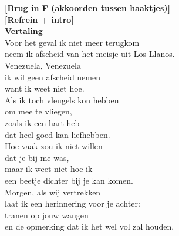 \textbf{[Brug in F (akkoorden tussen haaktjes)]}\\
\textbf{[Refrein + intro]}\\
\vspace{10em}
\textbf{Vertaling}\\
Voor het geval ik niet meer terugkom\\
neem ik afscheid van het meisje uit Los Llanos.\\
Venezuela, Venezuela\\
ik wil geen afscheid nemen\\
want ik weet niet hoe.\\\vspace{1em}
Als ik toch vleugels kon hebben\\
om mee te vliegen,\\
zoals ik een hart heb\\
dat heel goed kan liefhebben.\\\vspace{1em}
Hoe vaak zou ik niet willen\\
dat je bij me was,\\
maar ik weet niet hoe ik\\
een beetje dichter bij je kan komen.\\\vspace{1em}
Morgen, als wij vertrekken\\
laat ik een herinnering voor je achter:\\
tranen op jouw wangen\\
en de opmerking dat ik het wel vol zal houden. \\

